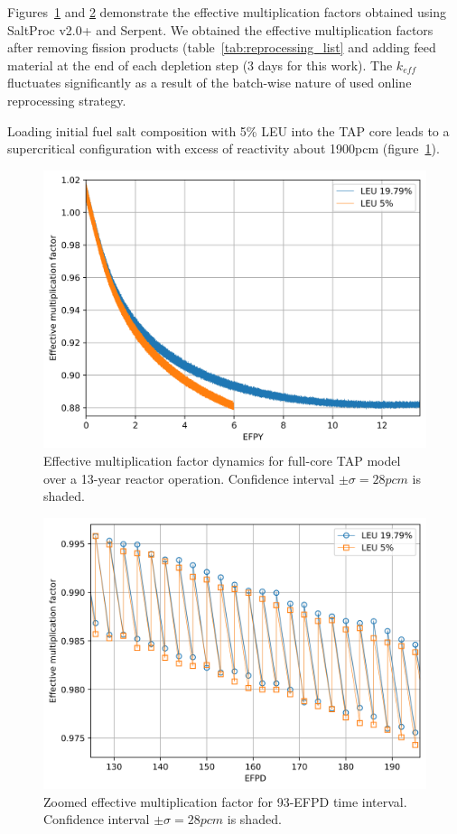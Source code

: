 \documentclass[12pt]{article} %
\begin{document}
Figures~\ref{fig:keff} and \ref{fig:keff-zoomed} demonstrate the effective 
multiplication factors  obtained using SaltProc v2.0+ and Serpent. We obtained 
the effective multiplication factors after removing fission products 
(table~\ref{tab:reprocessing_list} and adding feed material at the end of each 
depletion step (3 days for this work). The $k_{eff}$ fluctuates significantly as a result of the batch-wise nature of used online reprocessing strategy.

Loading initial fuel salt composition with 5\% \gls{LEU} into the \gls{TAP} 
core leads to a supercritical configuration with excess of reactivity about 
1900pcm (figure~\ref{fig:keff}).


\begin{figure}[htp!] %
  \centering
		  \includegraphics[width=1.05\textwidth]{keff.png}
  \caption{Effective multiplication factor dynamics for full-core
   \gls{TAP} model over a 13-year reactor operation. Confidence interval 
   $\pm\sigma=28pcm$ is shaded.}
  \label{fig:keff}
\end{figure}
\begin{figure}[htp!] %
  \centering
		  \includegraphics[width=\textwidth]{keff_zoomed.png}
  \caption{Zoomed effective multiplication factor for 93-EFPD time interval. 
	Confidence interval $\pm\sigma=28pcm$ is shaded.}
  \label{fig:keff-zoomed}
\end{figure}



%


%

\end{document}
